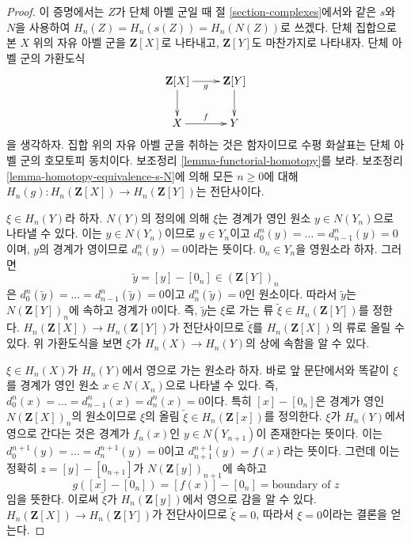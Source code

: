 \begin{proof}
이 증명에서는 $Z$가 단체 아벨 군일 때 절 \ref{section-complexes}에서와
같은 $s$와 $N$을 사용하여
$H_n(Z) = H_n(s(Z)) = H_n(N(Z))$로 쓰겠다. 단체 집합으로 본 $X$ 위의
자유 아벨 군을 $\mathbf{Z}[X]$로 나타내고, $\mathbf{Z}[Y]$도 마찬가지로
나타내자. 단체 아벨 군의 가환도식
$$
\xymatrix{
\mathbf{Z}[X] \ar[r]_g \ar[d] &
\mathbf{Z}[Y] \ar[d] \\
X \ar[r]^f & Y
}
$$
을 생각하자. 집합 위의 자유 아벨 군을 취하는 것은 함자이므로 수평
화살표는 단체 아벨 군의 호모토피 동치이다. 보조정리
\ref{lemma-functorial-homotopy}를 보라. 보조정리
\ref{lemma-homotopy-equivalence-s-N}에 의해 모든 $n \geq 0$에 대해
$H_n(g) : H_n(\mathbf{Z}[X]) \to H_n(\mathbf{Z}[Y])$는 전단사이다.

\medskip\noindent
$\xi \in H_n(Y)$라 하자. $N(Y)$의 정의에 의해 $\xi$는 경계가 영인
원소 $y \in N(Y_n)$으로 나타낼 수 있다. 이는 $y \in N(Y_n)$이므로
$y \in Y_n$이고 $d^n_0(y) = \ldots = d^n_{n - 1}(y) = 0$이며,
$y$의 경계가 영이므로 $d^n_n(y) = 0$이라는 뜻이다.
$0_n \in Y_n$을 영원소라 하자. 그러면
$$
\tilde y = [y] - [0_n] \in (\mathbf{Z}[Y])_n
$$
은 $d^n_0(\tilde y) = \ldots = d^n_{n - 1}(\tilde y) = 0$이고
$d^n_n(\tilde y) = 0$인 원소이다. 따라서 $\tilde y$는
$N(\mathbf{Z}[Y])_n$에 속하고 경계가 $0$이다. 즉, $\tilde y$는
$\xi$로 가는 류 $\tilde \xi \in H_n(\mathbf{Z}[Y])$를 정한다.
$H_n(\mathbf{Z}[X]) \to H_n(\mathbf{Z}[Y])$가 전단사이므로
$\tilde \xi$를 $H_n(\mathbf{Z}[X])$의 류로 올릴 수 있다. 위 가환도식을
보면 $\xi$가 $H_n(X) \to H_n(Y)$의 상에 속함을 알 수 있다.

\medskip\noindent
$\xi \in H_n(X)$가 $H_n(Y)$에서 영으로 가는 원소라 하자. 바로 앞
문단에서와 똑같이 $\xi$를 경계가 영인 원소 $x \in N(X_n)$으로 나타낼
수 있다. 즉,
$d^n_0(x) = \ldots = d^n_{n - 1}(x) = d^n_n(x) = 0$이다. 특히
$[x] - [0_n]$은 경계가 영인 $N(\mathbf{Z}[X])_n$의 원소이므로
$\xi$의 올림 $\tilde \xi \in H_n(\mathbf{Z}[x])$를 정의한다.
$\xi$가 $H_n(Y)$에서 영으로 간다는 것은 경계가 $f_n(x)$인
$y \in N(Y_{n + 1})$이 존재한다는 뜻이다. 이는
$d^{n + 1}_0(y) = \ldots = d^{n + 1}_n(y) = 0$이고
$d^{n + 1}_{n + 1}(y) = f(x)$라는 뜻이다. 그런데 이는 정확히
$z = [y] - [0_{n + 1}]$가 $N(\mathbf{Z}[y])_{n + 1}$에 속하고
$$
g([x] - [0_n]) = [f(x)] - [0_n] = \text{boundary of }z
$$
임을 뜻한다. 이로써 $\tilde \xi$가 $H_n(\mathbf{Z}[y])$에서 영으로
감을 알 수 있다.
$H_n(\mathbf{Z}[X]) \to H_n(\mathbf{Z}[Y])$가 전단사이므로
$\tilde \xi = 0$, 따라서 $\xi = 0$이라는 결론을 얻는다.
\end{proof}






